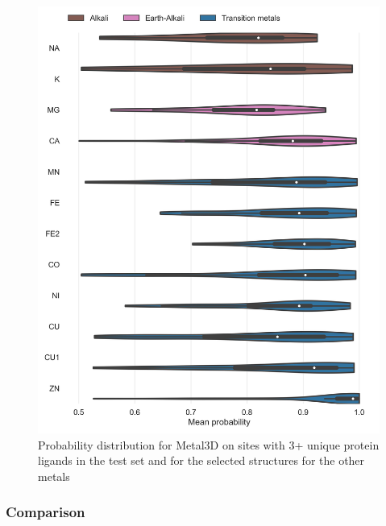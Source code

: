 \documentclass[  ASAPversion,
  ,
  9pt]{elife}
\newenvironment{fignos:tagged-figure}[1][]{
  \let\oldthefigure\thefigure
  \let\oldtheHfigure\theHfigure
  \renewcommand{\thefigure}{#1}
  \renewcommand{\theHfigure}{#1}
}{
  \let\thefigure\oldthefigure
  \let\theHfigure\oldtheHfigure
  \addtocounter{figure}{-1}
}
\begin{document}
\begin{fignos:tagged-figure}[S6]

\begin{figure}
\hypertarget{fig:selectivity-probability-metal3d}{%
\centering
\includegraphics{images/probability_violin.jpg}
\caption{Probability distribution for Metal3D on sites with 3+ unique protein ligands in the test set and for the selected structures for the other metals}\label{fig:selectivity-probability-metal3d}
}
\end{figure}

\end{fignos:tagged-figure}

\hypertarget{comparison-1}{%
\subsubsection{Comparison}\label{comparison-1}}
\end{document}
